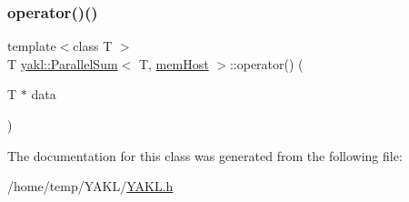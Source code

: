 \mbox{\label{classyakl_1_1ParallelSum_3_01T_00_01memHost_01_4_a292958b09ad6e72bba6e396e40a9e6e8}} 
\subsubsection{\texorpdfstring{operator()()}{operator()()}}
{\footnotesize\ttfamily template$<$class T $>$ \\
T \hyperlink{classyakl_1_1ParallelSum}{yakl\+::\+Parallel\+Sum}$<$ T, \hyperlink{namespaceyakl_aae8a8c910fec7cef7db68c9658c16405}{mem\+Host} $>$\+::operator() (\begin{DoxyParamCaption}\item[{T $\ast$}]{data }\end{DoxyParamCaption})\hspace{0.3cm}{\ttfamily [inline]}}



The documentation for this class was generated from the following file\+:\begin{DoxyCompactItemize}
\item 
/home/temp/\+Y\+A\+K\+L/\hyperlink{YAKL_8h}{Y\+A\+K\+L.\+h}\end{DoxyCompactItemize}
